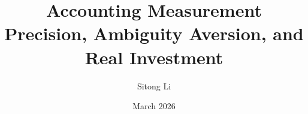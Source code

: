 \documentclass[11pt]{article}
\title{Accounting Measurement Precision, Ambiguity Aversion, and Real Investment}
\author{Sitong Li}
\date{March 2026}
\theoremstyle{definition}
\theoremstyle{remark}
\begin{document}
\maketitle

\begin{abstract}


\end{abstract}




% 
% 
% 




\end{document}
